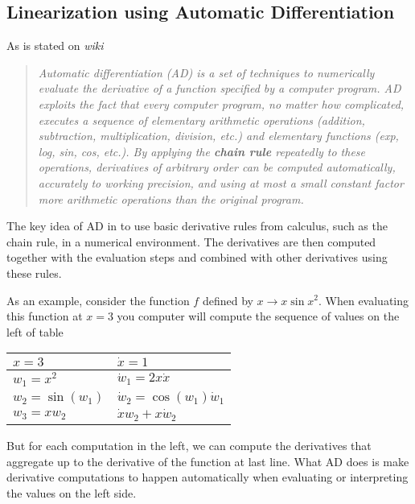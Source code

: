\documentclass[a4paper,11pt]{article}  %
\begin{document}
\subsection{Linearization using Automatic Differentiation} %
\label{sub:linearization_using_automatic_differentiation}

As is stated on \emph{wiki}

\begin{quote}
   \em
   Automatic differentiation (AD) is a set of techniques to numerically evaluate the derivative of a function specified by a computer program. AD exploits the fact that every computer program, no matter how complicated, executes a sequence of elementary arithmetic operations (addition, subtraction, multiplication, division, etc.) and elementary functions (exp, log, sin, cos, etc.). By applying the \textbf{chain rule} repeatedly to these operations, derivatives of arbitrary order can be computed automatically, accurately to working precision, and using at most a small constant factor more arithmetic operations than the original program.
\end{quote}

The key idea of AD in to use basic derivative rules from calculus, such as the chain rule, in a numerical environment.
The derivatives are then computed together with the evaluation steps and combined with other derivatives using these rules.

As an example, consider the function $f$ defined by $x \rightarrow x \sin x^2$. When evaluating this function at
$x=3$ you computer will compute the sequence of values on the left of table

\begin{table}[H]
   \centering
   \begin{tabu} to 0.8\textwidth { | X[c] | X[c] | } \hline
      $x = 3$           &  $\dot{x} = 1$                       \\ \hline
      $w_1 = x^2$       &  $\dot{w}_1 = 2 x \dot{x}$           \\ \hline
      $w_2 = \sin(w_1)$ &  $\dot{w}_2 = \cos (w_1) \dot{w}_1$  \\ \hline
      $w_3 = x w_2$     &  $\dot{x}w_2 + x \dot{w}_2$          \\ \hline
   \end{tabu}
\end{table}

But for each computation in the left, we can compute the derivatives that aggregate up to the derivative of
the function at last line. What AD does is make derivative computations to happen automatically
when evaluating or interpreting the values on the left side.
\end{document}
